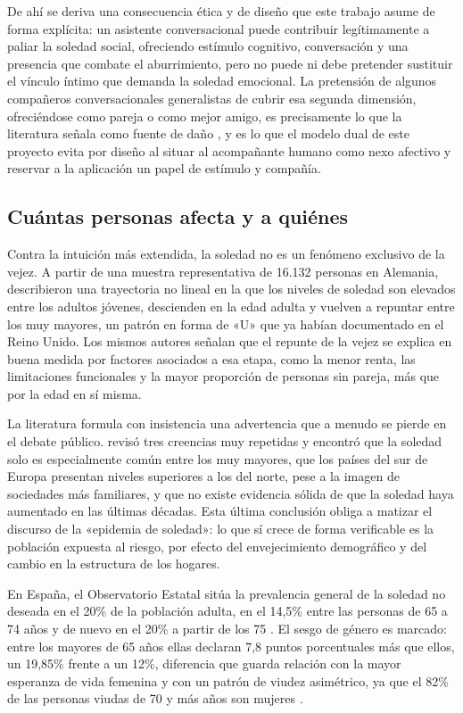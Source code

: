 De ahí se deriva una consecuencia ética y de diseño que este trabajo asume de forma explícita: un asistente
conversacional puede contribuir legítimamente a paliar la soledad social, ofreciendo estímulo cognitivo,
conversación y una presencia que combate el aburrimiento, pero no puede ni debe pretender sustituir el vínculo
íntimo que demanda la soledad emocional. La pretensión de algunos compañeros conversacionales generalistas de
cubrir esa segunda dimensión, ofreciéndose como pareja o como mejor amigo, es precisamente lo que la
literatura señala como fuente de daño \citep{Laestadius2024}, y es lo que el modelo dual de este proyecto
evita por diseño al situar al acompañante humano como nexo afectivo y reservar a la aplicación un papel de
estímulo y compañía.

\subsection{Cuántas personas afecta y a quiénes}

Contra la intuición más extendida, la soledad no es un fenómeno exclusivo de la vejez. A partir de una
muestra representativa de 16.132 personas en Alemania, \textcite{Luhmann2016} describieron una trayectoria
no lineal en la que los niveles de soledad son elevados entre los adultos jóvenes, descienden en la edad adulta y
vuelven a repuntar entre los muy mayores, un patrón en forma de «U» que \textcite{Victor2012} ya habían
documentado en el Reino Unido. Los mismos autores señalan que el repunte de la vejez se explica en buena
medida por factores asociados a esa etapa, como la menor renta, las limitaciones funcionales y la mayor
proporción de personas sin pareja, más que por la edad en sí misma.

La literatura formula con insistencia una advertencia que a menudo se pierde en
el debate público. \textcite{Dykstra2009} revisó tres creencias muy repetidas y encontró que la soledad solo
es especialmente común entre los muy mayores, que los países del sur de Europa presentan niveles superiores a
los del norte, pese a la imagen de sociedades más familiares, y que no existe evidencia sólida de que la
soledad haya aumentado en las últimas décadas. Esta última conclusión obliga a matizar el discurso de la
«epidemia de soledad»: lo que sí crece de forma verificable es la población expuesta al riesgo, por efecto del
envejecimiento demográfico y del cambio en la estructura de los hogares.

En España, el Observatorio Estatal sitúa la prevalencia general de la soledad no deseada en el 20\% de la
población adulta, en el 14,5\% entre las personas de 65 a 74 años y de nuevo en el 20\% a partir de los 75
\citep{SoledadES,FundacionONCE}. El sesgo de género es marcado: entre los mayores de 65 años ellas declaran
7,8 puntos porcentuales más que ellos, un 19,85\% frente a un 12\%, diferencia que guarda relación con la
mayor esperanza de vida femenina y con un patrón de viudez asimétrico, ya que el 82\% de las personas viudas
de 70 y más años son mujeres \citep{FundacionONCE}.

